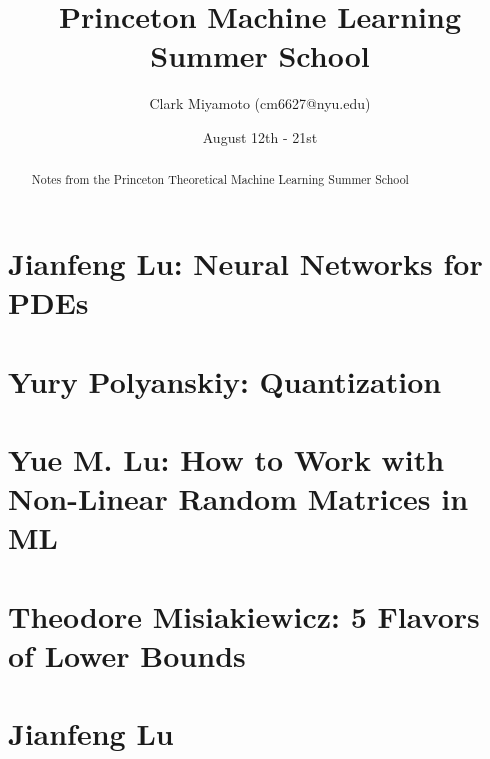 \documentclass[12pt,fleqn]{article}
\title{Princeton Machine Learning Summer School}
\author{Clark Miyamoto (cm6627@nyu.edu)}
\date{August 12th - 21st}
\numberwithin{equation}{section} %
\begin{document}
\maketitle


\begin{abstract}
	Notes from the Princeton Theoretical Machine Learning Summer School
\end{abstract}

\part{Jianfeng Lu: Neural Networks for PDEs}

\newpage

\part{Yury Polyanskiy: Quantization}

\newpage

\part{Yue M. Lu: How to Work with Non-Linear Random Matrices in ML}

\newpage

\part{Theodore Misiakiewicz: 5 Flavors of Lower Bounds}

\newpage

\part{Jianfeng Lu}
\newpage
\end{document}
